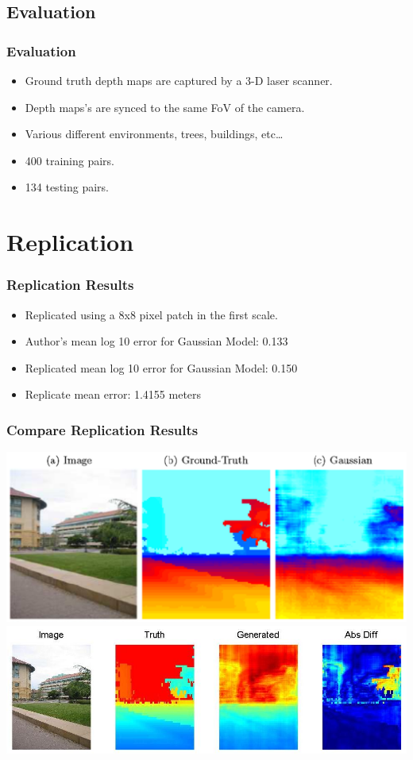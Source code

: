 \documentclass[handout]{beamer}
\newcommand{\vitem}{\vfill\item}
\begin{document}
\subsection{Evaluation}
\begin{frame}[t]\frametitle{Evaluation}
    \begin{itemize}
        \vitem Ground truth depth maps are captured by a 3-D laser scanner.
        \vitem Depth maps's are synced to the same FoV of the camera.
        \vitem Various different environments, trees, buildings, etc\dots
        \vitem 400 training pairs.
        \vitem 134 testing pairs.
    \end{itemize}
\end{frame}

\section{Replication}
\begin{frame}[t]\frametitle{Replication Results}
    \begin{itemize}
        \item Replicated using a 8x8 pixel patch in the first scale.
        \vitem Author's mean log 10 error for Gaussian Model: 0.133
        \vitem Replicated mean log 10 error for Gaussian Model: 0.150
        \vitem Replicate mean error: 1.4155 meters
    \end{itemize}
\end{frame}

\begin{frame}[t]\frametitle{Compare Replication Results}
    \includegraphics[width=\linewidth]{compare1.png} \\
    \vfill\includegraphics[width=\linewidth]{compare1.jpg}
\end{frame}
\end{document}
